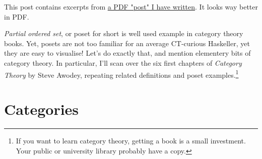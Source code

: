 \documentclass{article}
\begin{document}
This post contains excerpts from \href{https://oleg.fi/pdfs/Monotone.pdf}{a PDF "post" I have written}.
It looks way better in PDF.

\emph{Partial ordered set}, or poset for short is well used example in
category theory books.
Yet, posets are not too familiar for an average
CT-curious Haskeller, yet they are easy to visualise!
Let's do exactly that, and mention elementery bits of category theory.
In particular, I'll scan over the six first chapters of
\emph{Category Theory} by Steve Awodey,
repeating related definitions and poset examples.\footnote{%
If you want to learn category theory, getting a book is a small investment.
Your public or university library probably have a copy.
}

\section{Categories}
\label{sec:categories}
\end{document}
